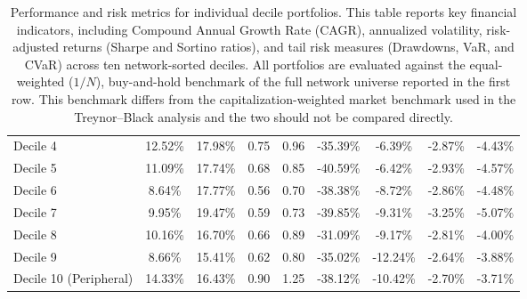 \documentclass[fleqn]{rbfin}
\begin{document}
\begin{table}[!htbp]
{\begin{tabular}{lcccccccc}
    Decile 4 & 12.52\% & 17.98\% & 0.75 & 0.96 & -35.39\% & -6.39\% & -2.87\% & -4.43\% \\
    Decile 5 & 11.09\% & 17.74\% & 0.68 & 0.85 & -40.59\% & -6.42\% & -2.93\% & -4.57\% \\
    Decile 6 & 8.64\% & 17.77\% & 0.56 & 0.70 & -38.38\% & -8.72\% & -2.86\% & -4.48\% \\
    Decile 7 & 9.95\% & 19.47\% & 0.59 & 0.73 & -39.85\% & -9.31\% & -3.25\% & -5.07\% \\
    Decile 8 & 10.16\% & 16.70\% & 0.66 & 0.89 & -31.09\% & -9.17\% & -2.81\% & -4.00\% \\
    Decile 9 & 8.66\% & 15.41\% & 0.62 & 0.80 & -35.02\% & -12.24\% & -2.64\% & -3.88\% \\
    Decile 10 (Peripheral) & 14.33\% & 16.43\% & 0.90 & 1.25 & -38.12\% & -10.42\% & -2.70\% & -3.71\% \\
    \bottomrule
    \end{tabular}%
    }
    \vspace{0.2cm}
        \caption{Performance and risk metrics for individual decile portfolios. This table reports key financial indicators, including Compound Annual Growth Rate (CAGR), annualized volatility, risk-adjusted returns (Sharpe and Sortino ratios), and tail risk measures (Drawdowns, VaR, and CVaR) across ten network-sorted deciles. All portfolios are evaluated against the equal-weighted ($1/N$), buy-and-hold benchmark of the full network universe reported in the first row. This benchmark differs from the capitalization-weighted market benchmark used in the Treynor--Black analysis and the two should not be compared directly.}
    \label{tab:perf_single}
\end{table}
\end{document}
